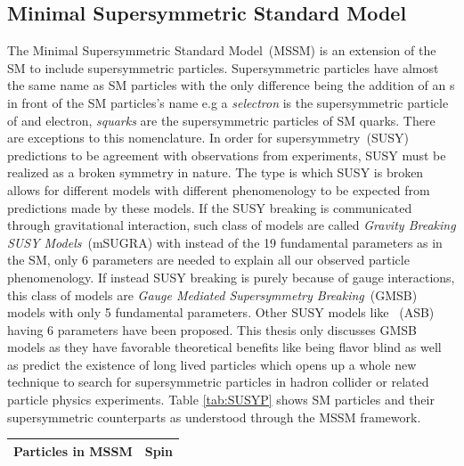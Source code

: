 \subsection{Minimal Supersymmetric Standard Model}
The Minimal Supersymmetric Standard Model~(MSSM) is an extension of the SM to include supersymmetric particles. Supersymmetric particles have almost the same name as SM particles with the only difference being the addition of an s in front of the SM particles's name e.g a \textit{selectron} is the supersymmetric particle of and electron, \textit{squarks} are the supersymmetric particles of SM quarks. There are exceptions to this nomenclature. In order for supersymmetry~(SUSY) predictions to be agreement with observations from experiments, SUSY must be realized as a broken symmetry in nature.
The type is which SUSY is broken allows for different models with different phenomenology to be expected from predictions made by these models. If the SUSY breaking is communicated through gravitational interaction, such class of models are called \textit{Gravity Breaking SUSY Models}~(mSUGRA) with instead of the 19 fundamental parameters as in the SM, only 6 parameters are needed to explain all our observed particle phenomenology. If instead SUSY breaking is purely  because of gauge interactions, this class of models are \textit{Gauge Mediated Supersymmetry Breaking}~(GMSB) models with only 5 fundamental parameters. Other SUSY models like ~(ASB) having 6 parameters have been proposed.
\newline
This thesis only discusses GMSB models as they have favorable theoretical benefits like being flavor blind as well as predict the existence of long lived particles which opens up a whole new technique to search for supersymmetric particles in hadron collider or related particle physics experiments.
Table \ref{tab:SUSYP} shows SM particles and their supersymmetric counterparts as understood through the MSSM framework.
\begin{center}
\centering
\begin{tabular}{c c}
\hline
\bfseries{Particles in MSSM} & \bfseries {Spin}\\
\hline

\hline \hline
\end{tabular}
\label{tab:SUSYP} 
\end{center}
